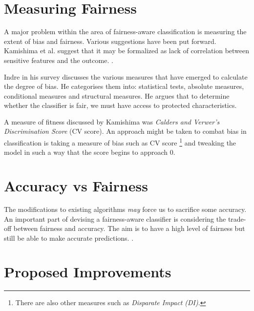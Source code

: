 \documentclass[a4paper, 12pt, titlepage]{article}
\begin{document}


\section*{Measuring Fairness}

A major problem within the area of fairness-aware classification is measuring the extent of bias and fairness. Various suggestions have been put forward.
Kamishima et al. suggest that it may be formalized as lack of correlation between sensitive features and the outcome. \cite[p.~259]{kamishima2018}.

Indre in his survey discusses the various measures that have emerged to calculate the degree of bias. He categorises them into: statistical tests, absolute measures, conditional measures and structural measures. He argues that to determine whether the classifier is fair, we must have access to protected characteristics. \cite[p.~8]{indre2015}

A measure of fitness discussed by Kamishima was \emph{Calders and Verwer's Discrimination Score} (CV score). An approach might be taken to combat bias in classification is taking a measure of bias such as CV score \footnote{There are also other measures such as \emph{Disparate Impact (DI)}.} and tweaking the model in such a way that the score begins to approach 0. 

\section*{Accuracy vs Fairness}

The modifications to existing algorithms \emph{may} force us to sacrifice some accuracy.  An important part of devising a fairness-aware classifier is considering the trade-off between fairness and accuracy. The aim is to have a high level of fairness but still be able to make accurate predictions.  \cite[p.~259]{kamishima2018} \cite[p.~9]{menon2018}. 

\section*{Proposed Improvements}
\end{document}
